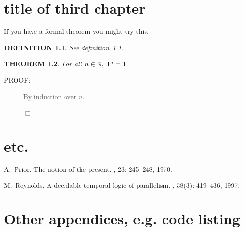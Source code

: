 \documentclass{report}
\newtheorem{theorem}{THEOREM}
\newtheorem{definition}[theorem]{DEFINITION}
\newenvironment{proof}{
PROOF:
\begin{quotation}}{
$\Box$ \end{quotation}}
\newcommand{\nats}{\mbox{\( \mathbb N \)}}
\begin{document}
\chapter{title of third chapter}
If you have a formal theorem you might try this.
\begin{definition}\label{def}
See definition~\ref{def}.
\end{definition}
\begin{theorem}
For all $n\in\nats,\; 1^n=1$.
\end{theorem}
\begin{proof}
By induction over $n$.
\end{proof}

\chapter{etc.}
\appendix


\begin{thebibliography}{HHM99}


A.~Prior.
\newblock The notion of the present.
, 23:  245--248, 1970.


M.~Reynolds.
\newblock A decidable temporal logic of parallelism.
, 38(3):  419--436,
  1997.
\end{thebibliography}
\chapter{Other appendices, e.g. code listing}
\end{document}
